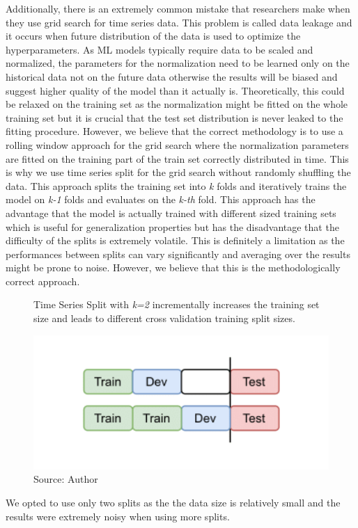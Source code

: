 Additionally, there is an extremely
common mistake that researchers make when they use grid search for time series data.
This problem is called data leakage and it occurs when future distribution of the data
is used to optimize the hyperparameters. As \ac{ML} models typically 
require data to be scaled and normalized, the parameters for the normalization 
need to be learned only on the historical data not on the future data otherwise the 
results will be biased and suggest higher quality of the model than it actually is.
Theoretically, this could be relaxed on the training set as the normalization
might be fitted on the whole training set but it is crucial that the test set distribution
is never leaked to the fitting procedure. However, we believe that
the correct methodology is to use a rolling window approach for the grid search
where the normalization parameters are fitted on the training part of the train set
correctly distributed in time.
This is why we use time series split for the grid search without randomly shuffling the data.
This approach splits the training set into \textit{k} folds and iteratively
trains the model on \textit{k-1} folds and evaluates on the \textit{k-th} fold.
This approach has the advantage that the model is actually trained with
different sized training sets which is useful for generalization properties
but has the disadvantage that the difficulty of the splits is extremely volatile.
This is definitely a limitation as the performances between splits
can vary significantly and averaging over the results might be prone to noise.
However, we believe that this is the methodologically correct approach.
\begin{figure}[!h]
    \centering
    \caption{Time Series Split with \textit{k=2} incrementally
    increases the training set size and leads to different cross 
    validation training split sizes.} 
    \includegraphics[width=1\textwidth]{Figures/time_series_split.drawio.png}
    \caption*{Source: Author}
    \label{fig:ts_split}
\end{figure}
We opted to use only two splits as the the data size
is relatively small and the results were extremely noisy when using
more splits.


